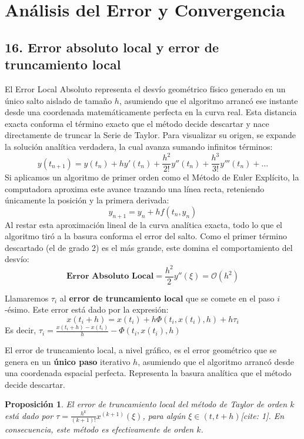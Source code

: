 \documentclass[12pt]{article}
\newtheorem{proposicion}{Proposición}
\begin{document}
\section*{Análisis del Error y Convergencia}

\subsection*{16. Error absoluto local y error de truncamiento local}

El Error Local Absoluto representa el desvío geométrico físico generado en un único salto aislado de tamaño $h$, asumiendo que el algoritmo arrancó ese instante desde una coordenada matemáticamente perfecta en la curva real. Esta distancia exacta conforma el término exacto que el método decide descartar y nace directamente de truncar la Serie de Taylor. Para visualizar su origen, se expande la solución analítica verdadera, la cual avanza sumando infinitos términos:
$$y(t_{n+1}) = y(t_n) + h y'(t_n) + \frac{h^2}{2!} y''(t_n) + \frac{h^3}{3!} y'''(t_n) + \dots$$Si aplicamos un algoritmo de primer orden como el Método de Euler Explícito, la computadora aproxima este avance trazando una línea recta, reteniendo únicamente la posición y la primera derivada:
$$y_{n+1} = y_n + h f(t_n, y_n)$$Al restar esta aproximación lineal de la curva analítica exacta, todo lo que el algoritmo tiró a la basura conforma el error del salto. Como el primer término descartado (el de grado 2) es el más grande, este domina el comportamiento del desvío:
$$\textbf{Error Absoluto Local} =\frac{h^2}{2} y''(\xi) = \mathcal{O}(h^2)$$

Llamaremos $\tau_i$ al \textbf{error de truncamiento local} que se comete en el paso $i$-ésimo. Este error está dado por la expresión:
\begin{equation}
    x(t_i + h) = x(t_i) + h\Phi(t_i, x(t_i), h) + h\tau_i
\end{equation}
Es decir, $\tau_i = \frac{x(t_i + h) - x(t_i)}{h} - \Phi(t_i, x(t_i), h)$

El error de truncamiento local, a nivel gráfico, es el error geométrico que se genera en un \textbf{único paso} iterativo $h$, asumiendo que el algoritmo arrancó desde una coordenada espacial perfecta. Representa la basura analítica que el método decide descartar.

\begin{proposicion}
El error de truncamiento local del método de Taylor de orden $k$ está dado por $\tau = \frac{h^k}{(k+1)!} x^{(k+1)}(\xi)$, para algún $\xi \in (t, t + h)$[cite: 1]. En consecuencia, este método es efectivamente de orden $k$.
\end{proposicion}
\end{document}
